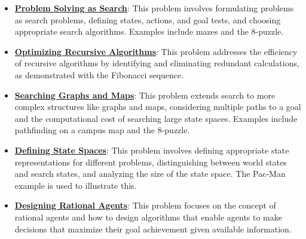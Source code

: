 \documentclass{article}%
\begin{document}
\begin{itemize}[leftmargin=*]
\item \href{https://purdue.brightspace.com/d2l/common/assets/pdfjs-d2l-dist/1.0.14-legacy/web/viewer.html?file=\%2Fcontent\%2Fenforced\%2F1095467-wl.202510.CS.24300.001\%2F14L1-DepthFS.pdf\%3Fou\%3D1095467\&lang=en-us\&container=d2l-fileviewer-rendered-pdf\&fullscreen=d2l-fileviewer-rendered-pdf-dialog\&height=667#page=12}{\textbf{Problem Solving as Search}}: This problem involves formulating problems as search problems, defining states, actions, and goal tests, and choosing appropriate search algorithms. Examples include mazes and the 8-puzzle.%
\item \href{https://purdue.brightspace.com/d2l/common/assets/pdfjs-d2l-dist/1.0.14-legacy/web/viewer.html?file=\%2Fcontent\%2Fenforced\%2F1095467-wl.202510.CS.24300.001\%2F14L1-DepthFS.pdf\%3Fou\%3D1095467\&lang=en-us\&container=d2l-fileviewer-rendered-pdf\&fullscreen=d2l-fileviewer-rendered-pdf-dialog\&height=667#page=21}{\textbf{Optimizing Recursive Algorithms}}: This problem addresses the efficiency of recursive algorithms by identifying and eliminating redundant calculations, as demonstrated with the Fibonacci sequence.%
\item \href{https://purdue.brightspace.com/d2l/common/assets/pdfjs-d2l-dist/1.0.14-legacy/web/viewer.html?file=\%2Fcontent\%2Fenforced\%2F1095467-wl.202510.CS.24300.001\%2F14L1-DepthFS.pdf\%3Fou\%3D1095467\&lang=en-us\&container=d2l-fileviewer-rendered-pdf\&fullscreen=d2l-fileviewer-rendered-pdf-dialog\&height=667#page=25}{\textbf{Searching Graphs and Maps}}: This problem extends search to more complex structures like graphs and maps, considering multiple paths to a goal and the computational cost of searching large state spaces. Examples include pathfinding on a campus map and the 8-puzzle.%
\item \href{https://purdue.brightspace.com/d2l/common/assets/pdfjs-d2l-dist/1.0.14-legacy/web/viewer.html?file=\%2Fcontent\%2Fenforced\%2F1095467-wl.202510.CS.24300.001\%2F14L1-DepthFS.pdf\%3Fou\%3D1095467\&lang=en-us\&container=d2l-fileviewer-rendered-pdf\&fullscreen=d2l-fileviewer-rendered-pdf-dialog\&height=667#page=37}{\textbf{Defining State Spaces}}: This problem involves defining appropriate state representations for different problems, distinguishing between world states and search states, and analyzing the size of the state space. The Pac-Man example is used to illustrate this.%
\item \href{https://purdue.brightspace.com/d2l/common/assets/pdfjs-d2l-dist/1.0.14-legacy/web/viewer.html?file=\%2Fcontent\%2Fenforced\%2F1095467-wl.202510.CS.24300.001\%2F14L1-DepthFS.pdf\%3Fou\%3D1095467\&lang=en-us\&container=d2l-fileviewer-rendered-pdf\&fullscreen=d2l-fileviewer-rendered-pdf-dialog\&height=667#page=39}{\textbf{Designing Rational Agents}}: This problem focuses on the concept of rational agents and how to design algorithms that enable agents to make decisions that maximize their goal achievement given available information.%
\end{itemize}
\end{document}
